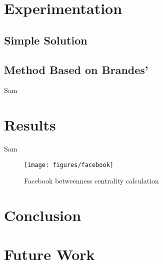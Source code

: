 \documentclass[11pt,a4paper,twocolumn,titlepage]{article}
\begin{document}
\section{Experimentation} %
\label{sec:methods}

\subsection{Simple Solution}

\subsection{Method Based on Brandes'}
Sam


\section{Results} %
\label{sec:results}

Sam

\begin{figure}[h]
\caption{Facebook betweenness centrality calculation}
\centering
\texttt{[image: figures/facebook]}
\end{figure}

\section{Conclusion} %
\label{sec:conclusion}



\section{Future Work}
\label{sec:future-work}



\newpage


\end{document}
